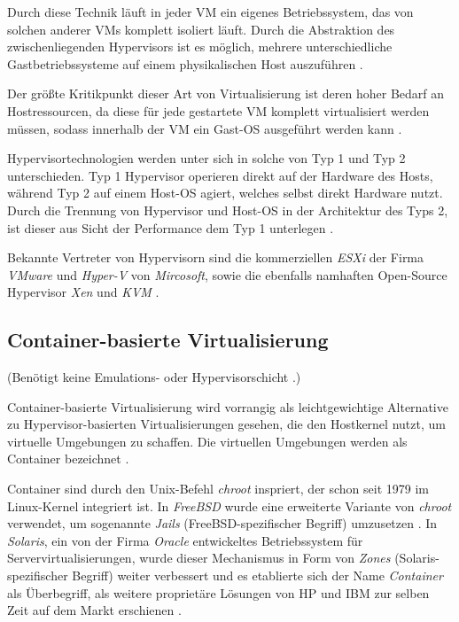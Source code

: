 \documentclass[../main.tex]{subfiles}
\begin{document}
      Durch diese Technik läuft in jeder VM ein eigenes Betriebssystem, das von solchen anderer VMs komplett isoliert läuft. Durch die Abstraktion des zwischenliegenden Hypervisors ist es möglich, mehrere unterschiedliche Gastbetriebssysteme auf einem physikalischen Host auszuführen \cite[S.2]{containerVirtPerformance}.

      Der größte Kritikpunkt dieser Art von Virtualisierung ist deren hoher Bedarf an Hostressourcen, da diese für jede gestartete VM komplett virtualisiert werden müssen, sodass innerhalb der VM ein Gast-OS ausgeführt werden kann \cite[S.1]{dockerIntroIEEE}\cite[S.3]{dockerLXCKub}.

      Hypervisortechnologien werden unter sich in solche von Typ 1 und Typ 2 unterschieden. Typ 1 Hypervisor operieren direkt auf der Hardware des Hosts, während Typ 2 auf einem Host-OS agiert, welches selbst direkt Hardware nutzt. Durch die Trennung von Hypervisor und Host-OS in der Architektur des Typs 2, ist dieser aus Sicht der Performance dem Typ 1 unterlegen \cite[S.2]{dockerSec1}.

      Bekannte Vertreter von Hypervisorn sind die kommerziellen \emph{ESXi} der Firma \emph{VMware} und \emph{Hyper-V} von \emph{Mircosoft}, sowie die ebenfalls namhaften Open-Source Hypervisor \emph{Xen} und \emph{KVM} \cite[S.1]{dockerLXCKub}.

    \subsection{Container-basierte Virtualisierung}
    \label{introVirtContainer}
      (Benötigt keine Emulations- oder Hypervisorschicht \cite[S.7]{dockerBook}.)

      Container-basierte Virtualisierung wird vorrangig als leichtgewichtige Alternative zu Hypervisor-basierten Virtualisierungen gesehen\cite[S.2]{containerVirtPerformance}, die den Hostkernel nutzt, um virtuelle Umgebungen zu schaffen. Die virtuellen Umgebungen werden als Container bezeichnet \cite[S.1]{dockerSec1}.

      Container sind durch den Unix-Befehl \emph{chroot}\cite{chroot} inspriert, der schon seit 1979 im Linux-Kernel integriert ist. In \emph{FreeBSD} wurde eine erweiterte Variante von \emph{chroot} verwendet, um sogenannte \emph{Jails} (FreeBSD-spezifischer Begriff) umzusetzen \cite{jails}. In \emph{Solaris}, ein von der Firma \emph{Oracle} entwickeltes Betriebssystem für Servervirtualisierungen\cite{solaris}, wurde dieser Mechanismus in Form von \emph{Zones} (Solaris-spezifischer Begriff) \cite{zones} weiter verbessert und es etablierte sich der Name \emph{Container} als Überbegriff, als weitere proprietäre Lösungen von HP und IBM zur selben Zeit auf dem Markt erschienen \cite[S.2]{dockerLXCKub}.
\end{document}
